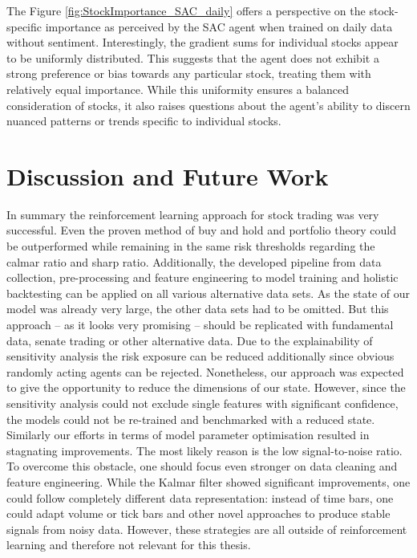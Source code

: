 \documentclass[12pt]{article}
\begin{document}
The Figure \ref{fig:StockImportance_SAC_daily} offers a perspective on the stock-specific importance as perceived by the SAC agent when trained on daily data without sentiment. Interestingly, the gradient sums for individual stocks appear to be uniformly distributed. This suggests that the agent does not exhibit a strong preference or bias towards any particular stock, treating them with relatively equal importance. While this uniformity ensures a balanced consideration of stocks, it also raises questions about the agent's ability to discern nuanced patterns or trends specific to individual stocks.

\section{Discussion and Future Work} 
\label{sec:disccution}
In summary the reinforcement learning approach for stock trading was very successful. Even the proven method of buy and hold and portfolio theory could be outperformed while remaining in the same risk thresholds regarding the calmar ratio and sharp ratio. Additionally, the developed pipeline from data collection, pre-processing and feature engineering to model training and holistic backtesting can be applied on all various alternative data sets. As the state of our model was already very large, the other data sets had to be omitted. But this approach -- as it looks very promising -- should be replicated with fundamental data, senate trading or other alternative data. Due to the explainability of sensitivity analysis the risk exposure can be reduced additionally since obvious randomly acting agents can be rejected. Nonetheless, our approach was expected to give the opportunity to reduce the dimensions of our state. However, since the sensitivity analysis could not exclude single features with significant confidence, the models could not be re-trained and benchmarked with a reduced state. Similarly our efforts in terms of model parameter optimisation resulted in stagnating improvements. The most likely reason is the low signal-to-noise ratio. To overcome this obstacle, one should focus even stronger on data cleaning and feature engineering. While the Kalmar filter showed significant improvements, one could follow completely different data representation: instead of time bars, one could adapt volume or tick bars and other novel approaches to produce stable signals from noisy data. However, these strategies are all  outside of reinforcement learning and therefore not relevant for this thesis.
\end{document}
